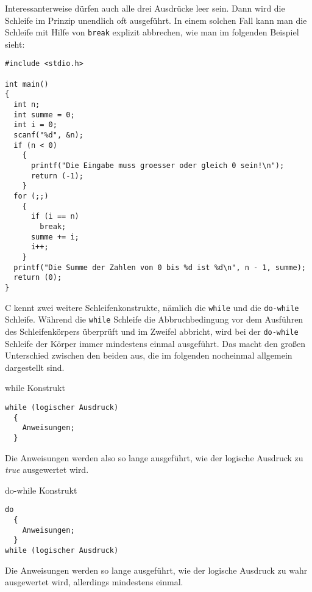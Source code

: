 Interessanterweise dürfen auch alle drei Ausdrücke leer sein.
Dann wird die Schleife im Prinzip unendlich oft ausgeführt.
In einem solchen Fall kann man die Schleife mit Hilfe von \verb|break| explizit abbrechen, wie man im folgenden Beispiel sieht:
\begin{lstlisting}
#include <stdio.h>

int main()
{
  int n;
  int summe = 0;
  int i = 0;
  scanf("%d", &n);
  if (n < 0)
    {
      printf("Die Eingabe muss groesser oder gleich 0 sein!\n");
      return (-1);
    }
  for (;;)
    {
      if (i == n)
        break;
      summe += i;
      i++;
    }
  printf("Die Summe der Zahlen von 0 bis %d ist %d\n", n - 1, summe);
  return (0);
}
\end{lstlisting}
C kennt zwei weitere Schleifenkonstrukte, nämlich die \verb|while| und die \verb|do-while| Schleife.
Während die \verb|while| Schleife die Abbruchbedingung vor dem Ausführen des Schleifenkörpers überprüft und im Zweifel abbricht, wird bei der \verb|do-while| Schleife der Körper immer mindestens einmal ausgeführt.
Das macht den großen Unterschied zwischen den beiden aus, die im folgenden nocheinmal allgemein dargestellt sind.
\begin{myalertblock}{while Konstrukt}
\begin{lstlisting}
while (logischer Ausdruck)
  {
    Anweisungen;
  }
\end{lstlisting}
\vspace{-0.5cm}
Die Anweisungen werden also so lange ausgeführt, wie der logische Ausdruck zu \emph{true} ausgewertet wird.
\end{myalertblock}

\begin{myalertblock}{do-while Konstrukt}
\begin{lstlisting}
do
  {
    Anweisungen;
  }
while (logischer Ausdruck)
\end{lstlisting}
\vspace{-0.5cm}
Die Anweisungen werden so lange ausgeführt, wie der logische Ausdruck zu wahr ausgewertet wird, allerdings mindestens einmal.
\end{myalertblock}

\endinput
